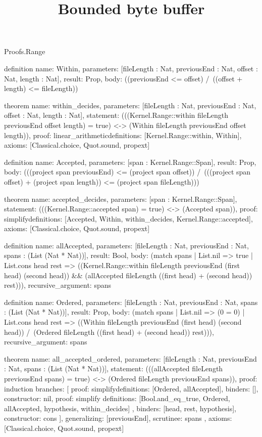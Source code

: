 \begin{lexlean}{Proofs.Range}
\title{Bounded byte buffer}
\begin{semanticmodule}
definition{
  name: Within,
  parameters: [fileLength : Nat, previousEnd : Nat, offset : Nat, length : Nat],
  result: Prop,
  body: ((previousEnd <= offset) /\ ((offset + length) <= fileLength))
}

theorem{
  name: within_decides,
  parameters: [fileLength : Nat, previousEnd : Nat, offset : Nat, length : Nat],
  statement: (((Kernel.Range::within fileLength previousEnd offset length) = true) <-> (Within fileLength previousEnd offset length)),
  proof: linear_arithmetic{definitions: [Kernel.Range::within, Within]},
  axioms: [Classical.choice, Quot.sound, propext]
}

definition{
  name: Accepted,
  parameters: [span : Kernel.Range::Span],
  result: Prop,
  body: (((project span previousEnd) <= (project span offset)) /\ (((project span offset) + (project span length)) <= (project span fileLength)))
}

theorem{
  name: accepted_decides,
  parameters: [span : Kernel.Range::Span],
  statement: (((Kernel.Range::accepted span) = true) <-> (Accepted span)),
  proof: simplify{definitions: [Accepted, Within, within_decides, Kernel.Range::accepted]},
  axioms: [Classical.choice, Quot.sound, propext]
}

definition{
  name: allAccepted,
  parameters: [fileLength : Nat, previousEnd : Nat, spans : (List (Nat * Nat))],
  result: Bool,
  body: (match spans
    | List.nil => true
    | List.cons head rest => ((Kernel.Range::within fileLength previousEnd (first head) (second head)) && (allAccepted fileLength ((first head) + (second head)) rest))),
  recursive_argument: spans
}

definition{
  name: Ordered,
  parameters: [fileLength : Nat, previousEnd : Nat, spans : (List (Nat * Nat))],
  result: Prop,
  body: (match spans
    | List.nil => (0 = 0)
    | List.cons head rest => ((Within fileLength previousEnd (first head) (second head)) /\ (Ordered fileLength ((first head) + (second head)) rest))),
  recursive_argument: spans
}

theorem{
  name: all_accepted_ordered,
  parameters: [fileLength : Nat, previousEnd : Nat, spans : (List (Nat * Nat))],
  statement: (((allAccepted fileLength previousEnd spans) = true) <-> (Ordered fileLength previousEnd spans)),
  proof: induction{
    branches: [
      {proof: simplify{definitions: [Ordered, allAccepted]}, binders: [], constructor: nil},
      {
        proof: simplify{
          definitions: [Bool.and_eq_true, Ordered, allAccepted, hypothesis, within_decides]
        },
        binders: [head, rest, hypothesis],
        constructor: cons
      }
    ],
    generalizing: [previousEnd],
    scrutinee: spans
  },
  axioms: [Classical.choice, Quot.sound, propext]
}
\end{semanticmodule}
\end{lexlean}
